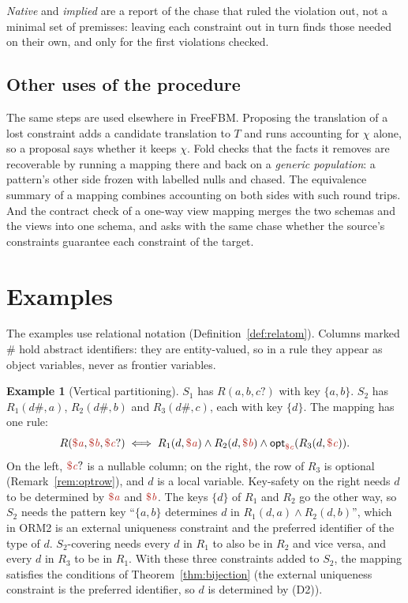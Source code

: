 \documentclass[11pt]{amsart}
\theoremstyle{definition}
\newtheorem{example}{Example}
\theoremstyle{remark}
\newcommand{\fv}[1]{\textcolor{BrickRed}{\$\mathit{#1}}}
\newcommand{\Opt}[1]{\mathsf{opt}_{#1}}
\newcommand{\corr}{\;\Longleftrightarrow\;}
\begin{document}
\emph{Native} and \emph{implied} are a report of the chase that ruled the
violation out, not a minimal set of premisses: leaving each constraint out
in turn finds those needed on their own, and only for the first
violations checked.

\subsection{Other uses of the procedure}

The same steps are used elsewhere in FreeFBM. Proposing the translation of
a lost constraint adds a candidate translation to $T$ and runs accounting
for $\chi$ alone, so a proposal says whether it keeps $\chi$. Fold checks
that the facts it removes are recoverable by running a mapping there and
back on a \emph{generic population}: a pattern's other side frozen with
labelled nulls and chased. The equivalence summary of a mapping combines
accounting on both sides with such round trips. And the contract check of
a one-way view mapping merges the two schemas and the views into one
schema, and asks with the same chase whether the source's constraints
guarantee each constraint of the target.

\section{Examples}
\label{sec:examples}

The examples use relational notation (Definition~\ref{def:relatom}).
Columns marked $\#$ hold abstract identifiers: they are entity-valued, so
in a rule they appear as object variables, never as frontier variables.

\begin{example}[Vertical partitioning]
\label{ex:vertical}
$S_1$ has $R(a, b, c?)$ with key $\{a, b\}$. $S_2$ has $R_1(d\#, a)$,
$R_2(d\#, b)$ and $R_3(d\#, c)$, each with key $\{d\}$. The mapping has one
rule:
$$R(\fv{a}, \fv{b}, \fv{c}?) \corr R_1(d, \fv{a}) \wedge R_2(d, \fv{b})
  \wedge \Opt{\fv{c}}(R_3(d, \fv{c})).$$
On the left, $\fv{c}?$ is a nullable column; on the right, the row of $R_3$
is optional (Remark~\ref{rem:optrow}), and $d$ is a local variable. Key-safety on the right needs $d$ to be
determined by $\fv{a}$ and $\fv{b}$. The keys $\{d\}$ of $R_1$ and $R_2$ go
the other way, so $S_2$ needs the pattern key ``$\{a, b\}$ determines $d$
in $R_1(d, a) \wedge R_2(d, b)$'', which in ORM2 is an external uniqueness
constraint and the preferred identifier of the type of $d$. $S_2$-covering
needs every $d$ in $R_1$ to also be in $R_2$ and vice versa, and every $d$
in $R_3$ to be in $R_1$. With these three constraints added to $S_2$, the
mapping satisfies the conditions of Theorem~\ref{thm:bijection} (the external uniqueness constraint is the preferred identifier, so $d$ is determined by (D2)).
\end{example}
\end{document}
